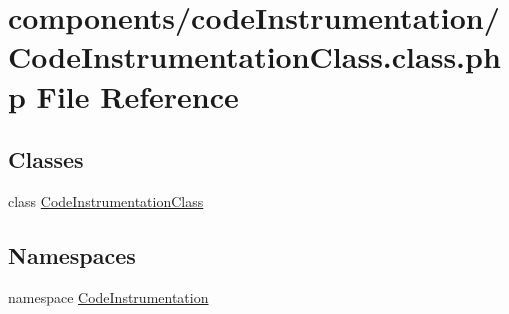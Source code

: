\hypertarget{_code_instrumentation_class_8class_8php}{
\section{components/codeInstrumentation/CodeInstrumentationClass.class.php File Reference}
\label{_code_instrumentation_class_8class_8php}
}
\subsection*{Classes}
\begin{CompactItemize}
\item 
class \hyperlink{class_code_instrumentation_class}{CodeInstrumentationClass}
\end{CompactItemize}
\subsection*{Namespaces}
\begin{CompactItemize}
\item 
namespace \hyperlink{namespace_code_instrumentation}{CodeInstrumentation}
\end{CompactItemize}

